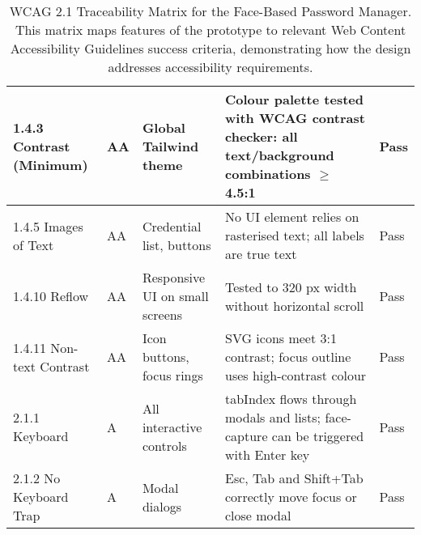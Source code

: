 \begin{table}[htbp]
\begin{tabular}{|p{2.5cm}|p{1.5cm}|p{4cm}|p{4cm}|p{1.2cm}|}
    1.4.3 Contrast (Minimum) & AA & Global Tailwind theme & Colour palette tested with WCAG contrast checker: all text/background combinations $\geq$ 4.5:1 & Pass \\ \hline
    
    1.4.5 Images of Text & AA & Credential list, buttons & No UI element relies on rasterised text; all labels are true text & Pass \\ \hline
    
    1.4.10 Reflow & AA & Responsive UI on small screens & Tested to 320 px width without horizontal scroll & Pass \\ \hline
    
    1.4.11 Non-text Contrast & AA & Icon buttons, focus rings & SVG icons meet 3:1 contrast; focus outline uses high-contrast colour & Pass \\ \hline
    
    2.1.1 Keyboard & A & All interactive controls & tabIndex flows through modals and lists; face-capture can be triggered with Enter key & Pass \\ \hline
    
    2.1.2 No Keyboard Trap & A & Modal dialogs & Esc, Tab and Shift+Tab correctly move focus or close modal & Pass \\ \hline
  \end{tabular}
  \caption[WCAG 2.1 Traceability Matrix]{WCAG 2.1 Traceability Matrix for the Face-Based Password Manager. This matrix maps features of the prototype to relevant Web Content Accessibility Guidelines success criteria, demonstrating how the design addresses accessibility requirements.}
  \label{tab:wcag-matrix}
\end{table}

